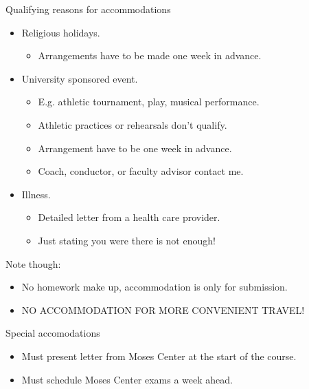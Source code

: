\documentclass{beamer}
\begin{document}
\begin{frame}{Qualifying reasons for accommodations}
\begin{itemize}
\item<1-> Religious holidays.
\begin{itemize}
\item<2-> Arrangements have to be made one week in advance.
\end{itemize}
\item<1-> University sponsored event.
\begin{itemize}
\item<3-> E.g. athletic tournament, play, musical performance.
\item<4-> Athletic practices or rehearsals don't qualify.
\item<5-> Arrangement have to be one week in advance.
\item<6-> Coach, conductor, or faculty advisor contact me.
\end{itemize}
\item<1-> Illness.
\begin{itemize}
\item<7-> Detailed letter from a health care provider.
\item<8-> Just stating you were there is not enough!
\end{itemize}
\end{itemize}


Note though:
\begin{itemize}
\item<9-> No homework make up, accommodation is only for submission.
\item<10-> NO ACCOMMODATION FOR MORE CONVENIENT TRAVEL!
\end{itemize}
\end{frame}

\begin{frame}{Special accomodations}
\begin{itemize}
\item Must present letter from Moses Center at the start of the course.\pause
\item Must schedule Moses Center exams a week ahead.
\end{itemize}
\end{frame}
\end{document}
